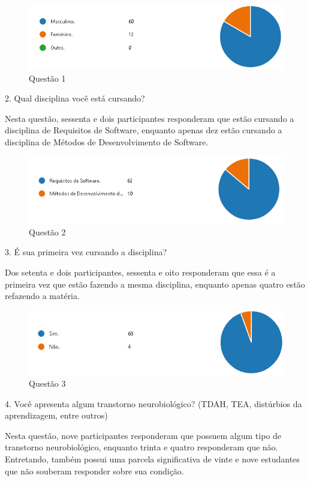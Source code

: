 \begin{figure}[H]
\centering
\includegraphics[scale=0.6]{figuras/1.png}
\caption{Questão 1}
\end{figure}

2. Qual disciplina você está cursando?

Nesta questão, sessenta e dois participantes responderam que estão cursando a disciplina de Requisitos de Software, enquanto apenas dez estão cursando a disciplina de Métodos de Desenvolvimento de Software.

\begin{figure}[H]
\centering
\includegraphics[scale=0.6]{figuras/2.png}
\caption{Questão 2}
\end{figure}

3. É sua primeira vez cursando a disciplina?

Dos setenta e dois participantes, sessenta e oito responderam que essa é a primeira vez que estão fazendo a mesma disciplina, enquanto apenas quatro estão refazendo a matéria.

\begin{figure}[H]
\centering
\includegraphics[scale=0.5]{figuras/3.png}
\caption{Questão 3}
\end{figure}

4. Você apresenta algum transtorno neurobiológico? (TDAH, TEA, distúrbios da aprendizagem, entre outros)

Nesta questão, nove participantes responderam que possuem algum tipo de transtorno neurobiológico, enquanto trinta e quatro responderam que não. Entretando, também possui uma parcela significativa de vinte e nove estudantes que não souberam responder sobre sua condição.

